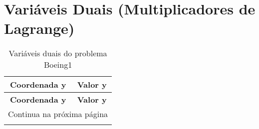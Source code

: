\documentclass[12pt]{article}
\begin{document}
\section{Variáveis Duais (Multiplicadores de Lagrange)}

\begin{longtable}{@{}cc@{}}
\caption{Variáveis duais do problema Boeing1} \\
\toprule
\textbf{Coordenada y} & \textbf{Valor y} \\
\midrule
\endfirsthead

\toprule
\textbf{Coordenada y} & \textbf{Valor y} \\
\midrule
\endhead

\midrule \multicolumn{2}{r}{{Continua na próxima página}} \\ \midrule
\endfoot


\end{longtable}
\end{document}
